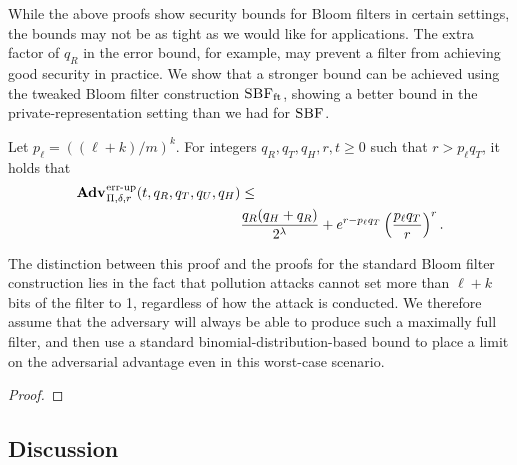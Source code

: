 While the above proofs show security bounds for Bloom filters in certain
settings, the bounds may not be as tight as we would like for applications. The
extra factor of $q_R$ in the error bound, for example, may prevent a filter from
achieving good security in practice. We show that a stronger bound can be
achieved using the tweaked Bloom filter construction $\textnormal{\textsc{SBF}}_\mathrm{ft}$, showing
a better bound in the private-representation setting than we had for $\textnormal{\textsc{SBF}}$.
%
\begin{theorem}\label{thm:bf-thr-bound}
Let $p_\ell = ((\ell+k)/m)^k$. For integers $q_R, q_T, q_H, r, t \geq 0$ such
that $r > p_\ell q_T$, it holds that
  \begin{equation*}
    \begin{aligned}
      \Adv{\errep}_{\Pi,\delta,r}(t, q_R,q_T,q_U,q_H) &\leq \\
        & \frac{q_R(q_H+q_R)}{2^\lambda} + e^{r-p_\ell q_T}\left(\frac{p_\ell q_T}{r}\right)^r.
    \end{aligned}
  \end{equation*}
\end{theorem}

The distinction between this proof and the proofs for the standard Bloom filter
construction lies in the fact that pollution attacks cannot set more than
$\ell+k$ bits of the filter to 1, regardless of how the attack is conducted.
We therefore assume that the adversary will always be able to produce such a
maximally full filter, and then use a standard binomial-distribution-based bound
to place a limit on the adversarial advantage even in this worst-case scenario.

\begin{proof}
  
\end{proof}


\subsection{Discussion}

